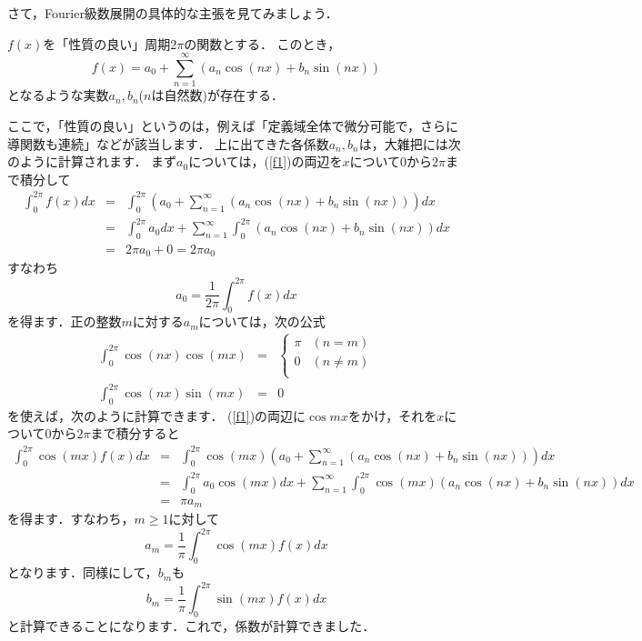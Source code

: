 さて，Fourier級数展開の具体的な主張を見てみましょう．
\begin{center}
$f(x)$を「性質の良い」周期$2 \pi$の関数とする．
このとき，
\begin{equation}
	f(x)=a_{0}+\sum_{n=1}^{\infty}\left( a_{n}\cos(nx)+b_{n}\sin (nx) \right)
	\label{f1}
\end{equation}
となるような実数$a_n, b_n$($n$は自然数)が存在する．
\end{center}
ここで，「性質の良い」というのは，例えば「定義域全体で微分可能で，さらに導関数も連続」などが該当します．
上に出てきた各係数$a_n, b_n$は，大雑把には次のように計算されます．
まず$a_0$については，(\ref{f1})の両辺を$x$について$0$から$2 \pi$まで積分して
\begin{eqnarray*}
	\int_{0}^{2 \pi}f(x)dx &=& \int_{0}^{2\pi} \left( a_{0}+\sum_{n=1}^{\infty}\left( a_{n}\cos(nx)+b_{n}\sin (nx) \right) \right) dx \\
	&=& \int_{0}^{2 \pi} a_{0} dx +\sum_{n=1}^{\infty} \int_{0}^{2\pi}\left( a_{n}\cos(nx)+b_{n}\sin (nx) \right) dx \\
	&=& 2\pi a_{0}+0=2 \pi a_{0}
\end{eqnarray*}
すなわち
\[
	a_0=\frac{1}{2\pi}\int_{0}^{2 \pi}f(x)dx
\]
を得ます．正の整数$m$に対する$a_m$については，次の公式
\begin{eqnarray*}
	\int_{0}^{2 \pi} \cos (nx) \cos (mx) &=&
	\begin{cases}
		\pi & (n=m) \\
		0 & (n \neq m) \\
	\end{cases}
	\\
	\int_{0}^{2 \pi} \cos (nx) \sin (mx) &=& 0
\end{eqnarray*}
を使えば，次のように計算できます．
(\ref{f1})の両辺に$\cos mx$をかけ，それを$x$について$0$から$2 \pi$まで積分すると
\begin{eqnarray*}
	\int_{0}^{2 \pi} \cos (mx) f(x) dx &=& \int_{0}^{2 \pi} \cos (mx)\left( a_{0}+\sum_{n=1}^{\infty}\left( a_{n}\cos(nx)+b_{n}\sin (nx) \right) \right) dx \\
	&=& \int_{0}^{2 \pi} a_{0} \cos (mx) dx +\sum_{n=1}^{\infty} \int_{0}^{2\pi} \cos (mx)\left( a_{n}\cos(nx)+b_{n}\sin (nx) \right) dx \\
	&=& \pi a_{m}
\end{eqnarray*}
を得ます．すなわち，$m \ge 1$に対して
\[
	a_{m}=\frac{1}{\pi} \int_{0}^{2 \pi} \cos (mx) f(x) dx
\]
となります．同様にして，$b_m$も
\[
	b_{m}=\frac{1}{\pi} \int_{0}^{2 \pi} \sin (mx) f(x) dx
\]
と計算できることになります．これで，係数が計算できました．

